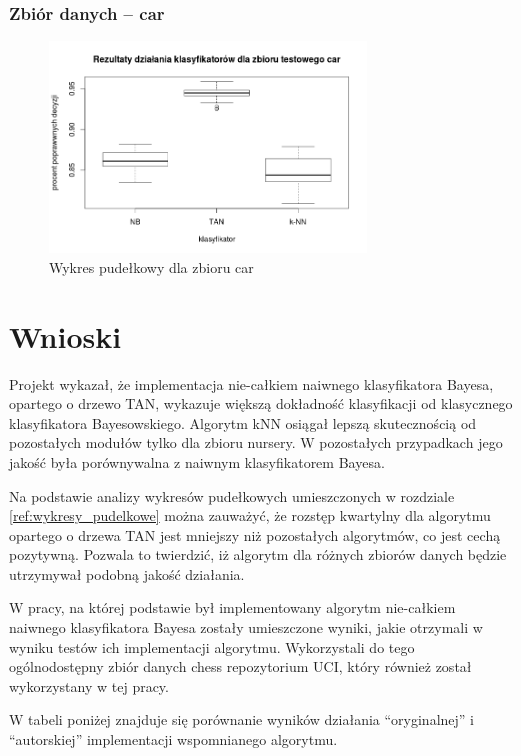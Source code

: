\documentclass[paper=a4, fontsize=11pt]{scrartcl} %
\numberwithin{equation}{section} %
\numberwithin{figure}{section} %
\numberwithin{table}{section} %
\begin{document}
\subsubsection{Zbiór danych -- car}

\begin{figure}[!h]
 \centering
\includegraphics[width=0.75\textwidth]{car_pic.png}
 \caption{Wykres pudełkowy dla zbioru car}
 \label{fig:model_drzewa}
\end{figure}

\clearpage

\section{Wnioski}
Projekt wykazał, że implementacja nie-całkiem naiwnego klasyfikatora Bayesa, opartego o drzewo TAN, wykazuje większą dokładność klasyfikacji od klasycznego klasyfikatora Bayesowskiego. Algorytm kNN  osiągał lepszą skutecznością od pozostałych modułów tylko dla zbioru nursery. W pozostałych przypadkach jego jakość była porównywalna z naiwnym klasyfikatorem Bayesa.

Na podstawie analizy wykresów pudełkowych umieszczonych w rozdziale  \ref{ref:wykresy_pudelkowe} można zauważyć, że rozstęp kwartylny dla algorytmu opartego o drzewa TAN jest mniejszy niż pozostałych algorytmów, co jest cechą pozytywną. Pozwala to twierdzić, iż algorytm dla różnych zbiorów danych będzie utrzymywał podobną jakość działania.

W pracy, na której podstawie był implementowany algorytm nie-całkiem naiwnego klasyfikatora Bayesa zostały umieszczone wyniki, jakie otrzymali w wyniku testów ich implementacji algorytmu. Wykorzystali do tego ogólnodostępny zbiór danych chess repozytorium UCI, który również został wykorzystany w tej pracy.

W tabeli poniżej znajduje się porównanie wyników działania "`oryginalnej"'  i "`autorskiej"'  implementacji wspomnianego algorytmu.
\end{document}
